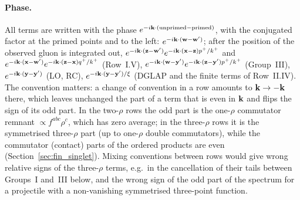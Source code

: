 \paragraph{Phase.} All terms are written with the phase $e^{-i\mathbf{k}\cdot(\text{unprimed}-\text{primed})}$, with the conjugated factor at the primed points and to the left: $e^{-i\mathbf{k}\cdot(\mathbf{w}-\mathbf{w}')}$; after the position of the observed gluon is integrated out, $e^{-i\mathbf{k}\cdot(\mathbf{z}-\mathbf{w}')}e^{-i\mathbf{k}\cdot(\mathbf{x}-\mathbf{z})p^+/k^+}$ and $e^{-i\mathbf{k}\cdot(\mathbf{x}-\mathbf{w}')}e^{-i\mathbf{k}\cdot(\mathbf{z}-\mathbf{x})q^+/k^+}$ (Row~I.V), $e^{-i\mathbf{k}\cdot(\mathbf{w}-\mathbf{y}')}e^{-i\mathbf{k}\cdot(\mathbf{z}-\mathbf{y}')p^+/k^+}$ (Group~III), $e^{-i\mathbf{k}\cdot(\mathbf{y}-\mathbf{y}')}$ (LO, RC), $e^{-i\mathbf{k}\cdot(\mathbf{y}-\mathbf{y}')/\xi}$ (DGLAP and the finite terms of Row~II.IV). The convention matters: a change of convention in a row amounts to $\mathbf{k}\to-\mathbf{k}$ there, which leaves unchanged the part of a term that is even in $\mathbf{k}$ and flips the sign of its odd part. In the two-$\rho$ rows the odd part is the one-$\rho$ commutator remnant $\propto f^{abc}\rho^c$, which has zero average; in the three-$\rho$ rows it is the symmetrised three-$\rho$ part (up to one-$\rho$ double commutators), while the commutator (contact) parts of the ordered products are even (Section~\ref{sec:fin_singlet}). Mixing conventions between rows would give wrong relative signs of the three-$\rho$ terms, e.g.\ in the cancellation of their tails between Groups~I and~III below, and the wrong sign of the odd part of the spectrum for a projectile with a non-vanishing symmetrised three-point function.

